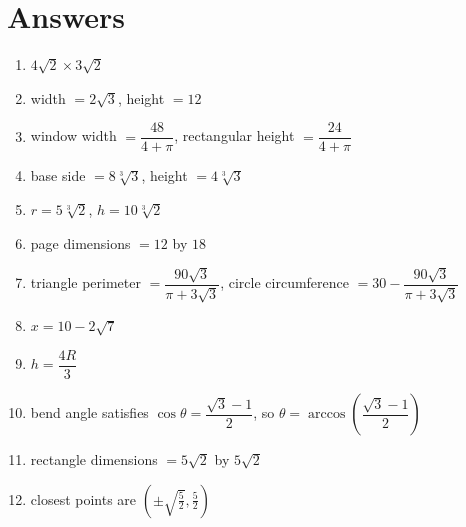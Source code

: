 \documentclass[12pt]{article}
\begin{document}
\section*{Answers}
\begin{enumerate}[leftmargin=*, itemsep=0.7em]
  \item $\displaystyle 4\sqrt{2}\times 3\sqrt{2}$
  \item width $=2\sqrt{3}$, height $=12$
  \item window width $=\dfrac{48}{4+\pi}$, rectangular height $=\dfrac{24}{4+\pi}$
  \item base side $=8\sqrt[3]{3}$, height $=4\sqrt[3]{3}$
  \item $r=5\sqrt[3]{2}$, $h=10\sqrt[3]{2}$
  \item page dimensions $=12$ by $18$
  \item triangle perimeter $=\dfrac{90\sqrt{3}}{\pi+3\sqrt{3}}$, circle circumference $=30-\dfrac{90\sqrt{3}}{\pi+3\sqrt{3}}$
  \item $x=10-2\sqrt{7}$
  \item $h=\dfrac{4R}{3}$
  \item bend angle satisfies $\cos\theta=\dfrac{\sqrt{3}-1}{2}$, so $\theta=\arccos\!\left(\dfrac{\sqrt{3}-1}{2}\right)$
  \item rectangle dimensions $=5\sqrt{2}$ by $5\sqrt{2}$
  \item closest points are $\left(\pm\sqrt{\frac52},\frac52\right)$
\end{enumerate}
\end{document}
